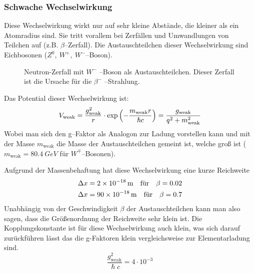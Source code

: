 \documentclass[Ex4_Zusammenfassung.tex]{subfiles}
\begin{document}
\subsubsection{Schwache Wechselwirkung}
Diese Wechselwirkung wirkt nur auf sehr kleine Abstände, die kleiner als ein Atomradius sind. Sie tritt vorallem bei Zerfällen und Umwandlungen von Teilchen auf (z.B.  $\beta$--Zerfall). Die Austauschteilchen dieser Wechselwirkung sind Eichbosonen ($Z^0,\ W^{+},\ W^{-}$--Boson).
\begin{figure}[H]
	\centering
	\caption{Neutron-Zerfall mit $W^-$ --Boson als Austauschteilchen. Dieser Zerfall ist die Ursache für die $ \beta^- $  --Strahlung.}
\end{figure}
Das Potential dieser Wechselwirkung ist:
\begin{equation}
	V_{\text{weak}} = \frac{g_{\text{weak}}^2}{r} \cdot \exp\left( -\frac{m_{\text{weak}} r}{\hslash c}\right) = \frac{g_{\text{weak}}}{q^2 + m_{\text{weak}}^2}
\end{equation}
Wobei man sich den g--Faktor als Analogon zur Ladung vorstellen kann und mit der Masse $ m_{\text{weak}} $ die Masse der Austauschteilchen gemeint ist, welche groß ist ( $m_{\text{weak}} = \SI{80.4}{GeV}$ für $ W^{\mp} $--Bosonen). 

Aufgrund der Massenbehaftung hat diese Wechselwirkung eine kurze Reichweite 
\begin{align}
	\Delta x &= \SI{2E-18}{m} \quad \text{für}  \quad \beta = 0.02 \\
	\Delta x &= \SI{90E-18}{m} \quad \text{für} \quad \beta = 0.7
\end{align} 
Unabhängig von der Geschwindigkeit $\beta$ der Austauschteilchen kann man also sagen, dass die Größenordnung der Reichweite sehr klein ist. Die Kopplungskonstante ist für diese Wechselwirkung auch klein, was sich darauf zurückführen lässt das die g-Faktoren klein vergleichsweise zur Elementarladung sind. 
\begin{equation}
	\frac{g_{\text{weak}}^2}{\hslash c} = 4 \cdot 10^{-3}
\end{equation} 
\end{document}

